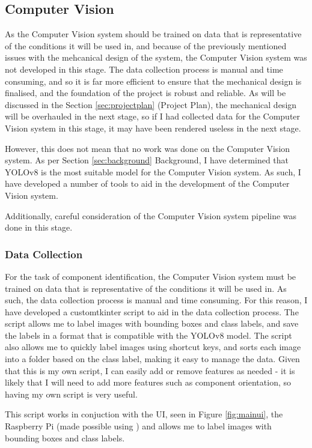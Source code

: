 \subsection{Computer Vision}
As the Computer Vision system should be trained on data that is representative of the conditions it will be used in, and because
of the previously mentioned issues with the mehcanical design of the system, the Computer Vision system was not developed in this stage.
The data collection process is manual and time consuming, and so it is far more efficient to ensure that the mechanical design is
finalised, and the foundation of the project is robust and reliable. As will be discussed in the Section \ref*{sec:projectplan} (Project Plan), 
the mechanical design will be overhauled in the next stage, so if I had collected data for the Computer Vision system in this stage,
it may have been rendered useless in the next stage.

However, this does not mean that no work was done on the Computer Vision system. As per Section \ref*{sec:background} {Background},
I have determined that YOLOv8 is the most suitable model for the Computer Vision system. As such, I have developed a number
of tools to aid in the development of the Computer Vision system.

Additionally, careful consideration of the Computer Vision system pipeline was done in this stage. 

\subsubsection{Data Collection}
For the task of component identification, the Computer Vision system must be trained on data that is representative of the conditions
it will be used in. As such, the data collection process is manual and time consuming. For this reason, I have developed a customtkinter\cite{customtkinter} script to aid in the data collection process.
The script allows me to label images with bounding boxes and class labels, and save the labels in a format that is compatible with
the YOLOv8 model. The script also allows me to quickly label images using shortcut keys, and sorts each image into a folder based on
the class label, making it easy to manage the data. Given that this is my own script, I can easily add or remove features as needed - it is likely
that I will need to add more features such as component orientation, so having my own script is very useful.

This script works in conjuction with the UI, seen in Figure \ref*{fig:mainui}, the Raspberry Pi (made possible using \citet{realvnc})
and allows me to label images with bounding boxes and class labels.

